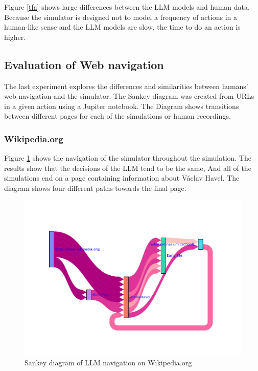 Figure \ref{tfa} shows large differences between the LLM models and human data. Because the simulator is designed not to model a frequency of actions in a human-like sense and the LLM models are slow, the time to do an action is higher.

\subsection{Evaluation of Web navigation}

The last experiment explores the differences and similarities between humans' web navigation and the simulator. The Sankey diagram was created from URLs in a given action using a Jupiter notebook. The Diagram shows transitions between different pages for each of the simulations or human recordings.

\subsubsection{Wikipedia.org}

Figure \ref{sankey_wikipedia_llm} shows the navigation of the simulator throughout the simulation. The results show that the decisions of the LLM tend to be the same, And all of the simulations end on a page containing information about Václav Havel. The diagram shows four different paths towards the final page. 


\begin{figure}[H]
    \centering
    \includegraphics[width=\textwidth]{obrazky-figures/sankey_wikipedia_llm.pdf}
    \caption{Sankey diagram of LLM navigation on Wikipedia.org}
    \label{sankey_wikipedia_llm}
\end{figure}

